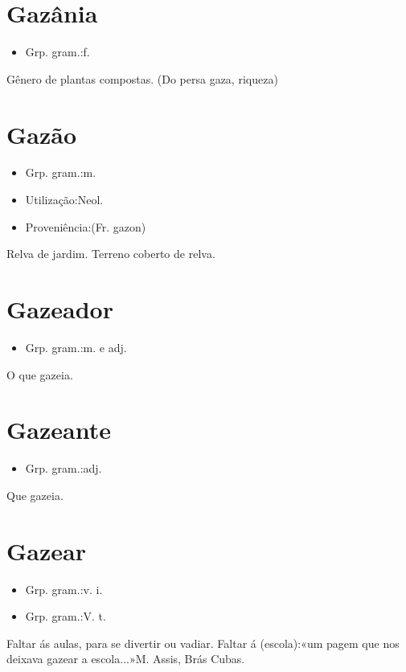 \section{Gazânia}
\begin{itemize}
\item {Grp. gram.:f.}
\end{itemize}
Gênero de plantas compostas.
(Do persa \textunderscore gaza\textunderscore , riqueza)
\section{Gazão}
\begin{itemize}
\item {Grp. gram.:m.}
\end{itemize}
\begin{itemize}
\item {Utilização:Neol.}
\end{itemize}
\begin{itemize}
\item {Proveniência:(Fr. \textunderscore gazon\textunderscore )}
\end{itemize}
Relva de jardim.
Terreno coberto de relva.
\section{Gazeador}
\begin{itemize}
\item {Grp. gram.:m.  e  adj.}
\end{itemize}
O que gazeia.
\section{Gazeante}
\begin{itemize}
\item {Grp. gram.:adj.}
\end{itemize}
Que gazeia.
\section{Gazear}
\begin{itemize}
\item {Grp. gram.:v. i.}
\end{itemize}
\begin{itemize}
\item {Grp. gram.:V. t.}
\end{itemize}
Faltar ás aulas, para se divertir ou vadiar.
Faltar á (escola):«\textunderscore um pagem que nos deixava gazear a escola...\textunderscore »M. Assis, \textunderscore Brás Cubas\textunderscore .
